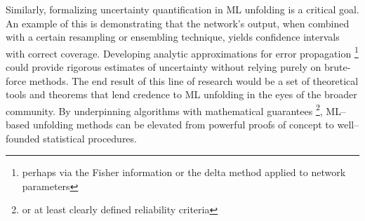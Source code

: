                 Similarly, formalizing uncertainty quantification in ML unfolding is a critical goal.
                An example of this is demonstrating that the network's output, when combined with a certain resampling or ensembling technique, yields confidence intervals with correct coverage.
                Developing analytic approximations for error propagation \footnote{perhaps via the Fisher information or the delta method applied to network parameters} could provide rigorous estimates of uncertainty without relying purely on brute-force methods.
                The end result of this line of research would be a set of theoretical tools and theorems that lend credence to ML unfolding in the eyes of the broader community.
                By underpinning algorithms with mathematical guarantees \footnote{or at least clearly defined reliability criteria}, ML--based unfolding methods can be elevated from powerful proofs of concept to well--founded statistical procedures.

